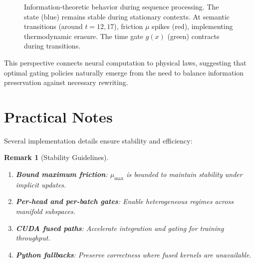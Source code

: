 \documentclass[12pt,letterpaper,twoside]{article}
\newtheorem{remarque}{Remark}[section]
\begin{document}
\begin{figure}[htbp]
\centering
{}
\caption{Information-theoretic behavior during sequence processing. The state (blue) remains stable during stationary contexts. At semantic transitions (around $t=12, 17$), friction $\mu$ spikes (red), implementing thermodynamic erasure. The time gate $g(x)$ (green) contracts during transitions.}
\label{fig:information-flow}
\end{figure}

This perspective connects neural computation to physical laws, suggesting that optimal gating policies naturally emerge from the need to balance information preservation against necessary rewriting.

\section{Practical Notes}

Several implementation details ensure stability and efficiency:

\begin{remarque}[Stability Guidelines]
\begin{enumerate}
\item \textbf{Bound maximum friction}: $\mu_{\max}$ is bounded to maintain stability under implicit updates.
\item \textbf{Per-head and per-batch gates}: Enable heterogeneous regimes across manifold subspaces.
\item \textbf{CUDA fused paths}: Accelerate integration and gating for training throughput.
\item \textbf{Python fallbacks}: Preserve correctness where fused kernels are unavailable.
\end{enumerate}
\end{remarque}
\end{document}
